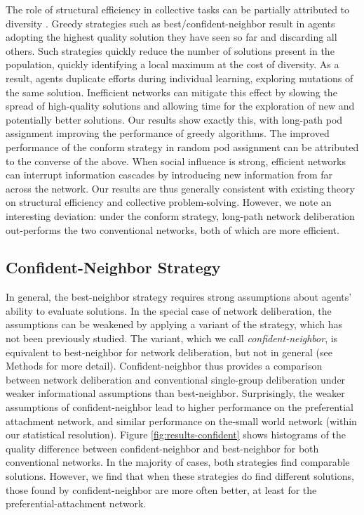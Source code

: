\documentclass[twocolumn,10pt]{article}
\begin{document}
The role of structural efficiency in collective tasks can be partially attributed to diversity \cite{lazer_network_2007, hong_groups_2004}. Greedy strategies such as best/confident-neighbor result in agents adopting the highest quality solution they have seen so far and discarding all others. Such strategies quickly reduce the number of solutions present in the population, quickly identifying a local maximum at the cost of diversity. As a result, agents duplicate efforts during individual learning, exploring mutations of the same solution. Inefficient networks can mitigate this effect by slowing the spread of high-quality solutions and allowing time for the exploration of new and potentially better solutions. Our results show exactly this, with long-path pod assignment improving the performance of greedy algorithms. The improved performance of the conform strategy in random pod assignment can be attributed to the converse of the above. When social influence is strong, efficient networks can interrupt information cascades by introducing new information from far across the network.
Our results are thus generally consistent with existing theory on structural efficiency and collective problem-solving.
However, we note an interesting deviation: under the conform strategy, long-path network deliberation out-performs the two conventional networks, both of which are more efficient.

\subsection{Confident-Neighbor Strategy}

In general, the best-neighbor strategy requires strong assumptions about agents' ability to evaluate solutions. In the special case of network deliberation, the assumptions can be weakened by applying a variant of the strategy, which has not been previously studied. The variant, which we call {\em confident-neighbor}, is equivalent to best-neighbor for network deliberation, but not in general (see Methods for more detail). Confident-neighbor thus provides a comparison between network deliberation and conventional single-group deliberation under weaker informational assumptions than best-neighbor. Surprisingly, the weaker assumptions of confident-neighbor lead to higher performance on the preferential attachment network, and similar performance on the-small world network (within our statistical resolution). Figure \ref{fig:results-confident} shows histograms of the quality difference between confident-neighbor and best-neighbor for both conventional networks. In the majority of cases, both strategies find comparable solutions. However, we find that when these strategies do find different solutions, those found by confident-neighbor are more often better, at least for the preferential-attachment network.
\end{document}
